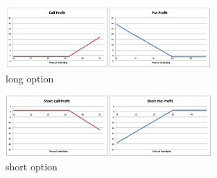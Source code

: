 \begin{multicols}{2}
\end{multicols}

\begin{figure}[H]
    \centering 
    \includegraphics[width =0.7\textwidth]{Figure/long.png}
    \caption*{long option}
\end{figure}

\begin{figure}[H]
    \centering 
    \includegraphics[width =0.7\textwidth]{Figure/short.png}
    \caption*{short option}
\end{figure}


